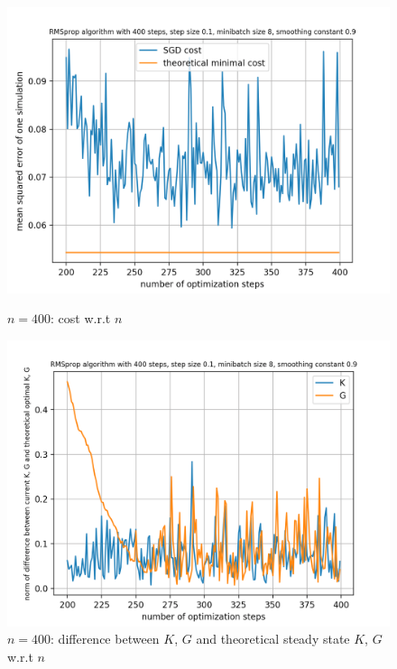 \documentclass{article}
\begin{document}
\begin{figure}[h!]
	\centering
	\begin{minipage}[t]{.28\paperwidth}
		\centering
		\includegraphics[width=1.0\textwidth]{Figures/last200_n400.png}
		\caption{$n = 400$: cost w.r.t $n$\label{fig:last200_n400}}
	\end{minipage}%
	\begin{minipage}[t]{.28\paperwidth}
		\centering
		\includegraphics[width=1.0\textwidth]{Figures/d_last200_n400.png}
		\caption{$n = 400$: difference between $K$, $G$ and theoretical steady state $K$, $G$ w.r.t $n$}
	\end{minipage}%
	\begin{minipage}[t]{.28\paperwidth}
		\centering

\end{minipage}
\end{figure}
\end{document}
